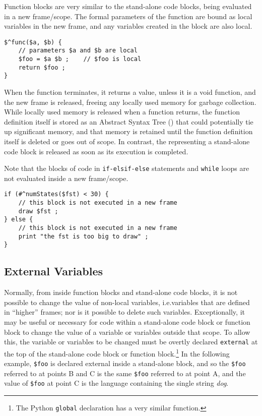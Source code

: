Function blocks are very similar to the stand-alone code blocks, being
evaluated in a new frame/scope.  The formal parameters of the function are
bound as local variables in the
new frame, and any variables created in the block are also local.


\begin{Verbatim}
$^func($a, $b) {
    // parameters $a and $b are local
    $foo = $a $b ;    // $foo is local
    return $foo ;
}
\end{Verbatim}

\noindent
When the function terminates, it returns a value, unless it is a void function, and the
new frame is released, freeing any locally used memory for garbage
collection.  While locally used memory is released when a function returns, the
function definition itself is stored as an Abstract Syntax Tree () that could
potentially tie up 
significant memory, and that memory is retained until the function definition
itself is deleted or goes out of scope.  In contrast, the  representing a
stand-alone code block is released as soon as its execution is completed.

Note that the blocks of code in \texttt{if-elsif-else} statements and \texttt{while}
loops are not evaluated inside a new frame/scope.

\begin{Verbatim}
if (#^numStates($fst) < 30) {
    // this block is not executed in a new frame
    draw $fst ;
} else {
    // this block is not executed in a new frame
    print "the fst is too big to draw" ;
}
\end{Verbatim}


\subsection{External Variables}

Normally, from inside function blocks and stand-alone code blocks,
it is not possible to change the value of non-local variables,
i.e.\@ variables that are defined in ``higher'' frames; nor is it
possible to delete such variables.  Exceptionally, it may be useful
or necessary for code within a stand-alone code block or function
block to change the value of a variable or variables outside that
scope.  To allow this, the variable or variables to be changed must
be overtly declared \texttt{external} at the top of the stand-alone
code block or function block.\footnote{The Python \texttt{global}
declaration has a very similar function.}  In the following
example, \verb!$foo! is declared external inside a stand-alone
block, and so the \verb!$foo! referred to at points B and C is the
same \verb!$foo! referred to at point A, and the value of
\verb!$foo! at point C is the language containing the single string
\emph{dog}.

